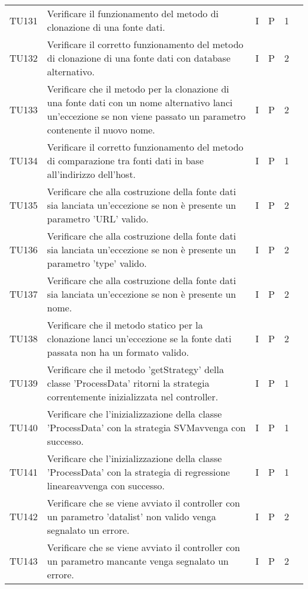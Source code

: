 \begin{longtable} {
		>{}p{12mm}
		>{}p{79.5mm}
		>{}p{9mm}
		>{}p{8mm}
		>{}p{14mm}
		>{}p{0mm}}
	TU131		& Verificare il funzionamento del metodo di clonazione di una fonte dati. & I & P & 1 & \TBstrut \\ [2mm]
	TU132		& Verificare il corretto funzionamento del metodo di clonazione di una fonte dati con database alternativo. & I & P & 2 & \TBstrut \\ [2mm]
	TU133		& Verificare che il metodo per la clonazione di una fonte dati con un nome alternativo lanci un'eccezione se non viene passato un parametro contenente il nuovo nome. & I & P & 2 & \TBstrut \\ [2mm]
	TU134		& Verificare il corretto funzionamento del metodo di comparazione tra fonti dati in base all'indirizzo dell'host. & I & P & 1 & \TBstrut \\ [2mm]
	TU135		& Verificare che alla costruzione della fonte dati sia lanciata un'eccezione se non è presente un parametro 'URL' valido. & I & P & 2 & \TBstrut \\ [2mm]
	TU136		& Verificare che alla costruzione della fonte dati sia lanciata un'eccezione se non è presente un parametro 'type' valido. & I & P & 2 & \TBstrut \\ [2mm]
	TU137		& Verificare che alla costruzione della fonte dati sia lanciata un'eccezione se non è presente un nome. & I & P & 2 & \TBstrut \\ [2mm]
	TU138		& Verificare che il metodo statico per la clonazione lanci un'eccezione se la fonte dati passata non ha un formato valido. & I & P & 2 & \TBstrut \\ [2mm]
	TU139		& Verificare che il metodo 'getStrategy' della classe 'ProcessData' ritorni la strategia correntemente inizializzata nel controller. & I & P & 1 & \TBstrut \\ [2mm]
	TU140		& Verificare che l'inizializzazione della classe 'ProcessData' con la strategia SVM\glosp avvenga con successo. & I & P & 1 & \TBstrut \\ [2mm]
	TU141		& Verificare che l'inizializzazione della classe 'ProcessData' con la strategia di regressione lineare\glosp avvenga con successo. & I & P & 1 & \TBstrut \\ [2mm]
	TU142		& Verificare che se viene avviato il controller con un parametro 'datalist' non valido venga segnalato un errore. & I & P & 2 & \TBstrut \\ [2mm]
	TU143		& Verificare che se viene avviato il controller con un parametro mancante venga segnalato un errore. & I & P & 2 & \TBstrut \\ [2mm]

\end{longtable}

